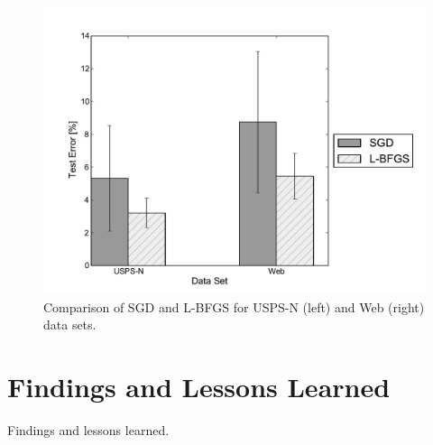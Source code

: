 \documentclass[10pt]{article}
\begin{document}
\begin{figure}[h]
\begin{center}
    \includegraphics[width=1.0\textwidth]{test_error.pdf}
    \caption{Comparison of SGD and L-BFGS for USPS-N (left) and Web (right) data sets.}
\end{center}
\end{figure}


\section{Findings and Lessons Learned}
\label{sec:conclusion}

Findings and lessons learned.





\end{document}
